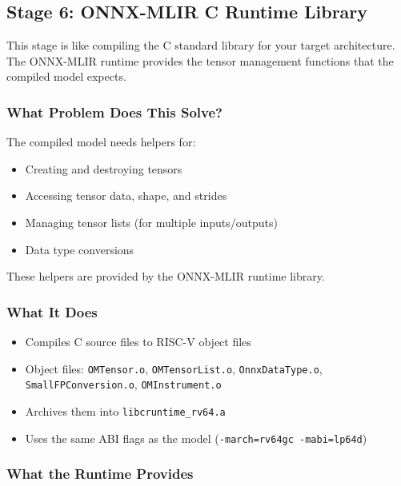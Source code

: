 \documentclass[12pt,a4paper]{article}
\begin{document}
\subsection{Stage 6: ONNX-MLIR C Runtime Library}

\begin{analogyenv}
This stage is like compiling the C standard library for your target architecture. The ONNX-MLIR runtime provides the tensor management functions that the compiled model expects.
\end{analogyenv}

\subsubsection{What Problem Does This Solve?}
The compiled model needs helpers for:
\begin{itemize}
  \item Creating and destroying tensors
  \item Accessing tensor data, shape, and strides
  \item Managing tensor lists (for multiple inputs/outputs)
  \item Data type conversions
\end{itemize}

These helpers are provided by the ONNX-MLIR runtime library.

\subsubsection{What It Does}
\begin{itemize}
  \item Compiles C source files to RISC-V object files
  \item Object files: \texttt{OMTensor.o}, \texttt{OMTensorList.o}, \texttt{OnnxDataType.o}, \texttt{SmallFPConversion.o}, \texttt{OMInstrument.o}
  \item Archives them into \texttt{libcruntime\_rv64.a}
  \item Uses the same ABI flags as the model (\texttt{-march=rv64gc -mabi=lp64d})
\end{itemize}

\subsubsection{What the Runtime Provides}
\end{document}
